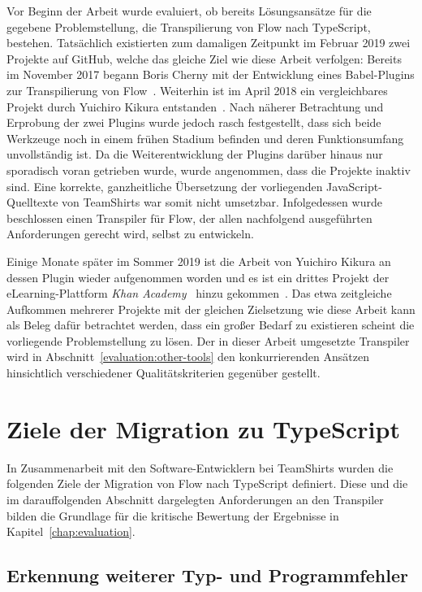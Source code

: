Vor Beginn der Arbeit wurde evaluiert, ob bereits Lösungsansätze für die gegebene Problemstellung, die Transpilierung von Flow nach TypeScript, bestehen. Tatsächlich existierten zum damaligen Zeitpunkt im Februar 2019 zwei Projekte auf GitHub, welche das gleiche Ziel wie diese Arbeit verfolgen: Bereits im November 2017 begann Boris Cherny mit der Entwicklung eines Babel-Plugins zur Transpilierung von Flow~\autocite{CHERNY:FLOW_TO_TS}. Weiterhin ist im April 2018 ein vergleichbares Projekt durch Yuichiro Kikura entstanden~\autocite{KIKURA:FLOW_TO_TS}. Nach näherer Betrachtung und Erprobung der zwei Plugins wurde jedoch rasch festgestellt, dass sich beide Werkzeuge noch in einem frühen Stadium befinden und deren Funktionsumfang unvollständig ist. Da die Weiterentwicklung der Plugins darüber hinaus nur sporadisch voran getrieben wurde, wurde angenommen, dass die Projekte inaktiv sind. Eine korrekte, ganzheitliche Übersetzung der vorliegenden JavaScript-Quelltexte von TeamShirts war somit nicht umsetzbar. Infolgedessen wurde beschlossen einen Transpiler für Flow, der allen nachfolgend ausgeführten Anforderungen gerecht wird, selbst zu entwickeln.

Einige Monate später im Sommer 2019 ist die Arbeit von Yuichiro Kikura an dessen Plugin wieder aufgenommen worden und es ist ein drittes Projekt der eLearning-Plattform \textit{Khan Academy}~\autocite{KHAN_ACADEMY} hinzu gekommen~\autocite{KHAN:FLOW_TO_TS}. Das etwa zeitgleiche Aufkommen mehrerer Projekte mit der gleichen Zielsetzung wie diese Arbeit kann als Beleg dafür betrachtet werden, dass ein großer Bedarf zu existieren scheint die vorliegende Problemstellung zu lösen. Der in dieser Arbeit umgesetzte Transpiler wird in Abschnitt~\ref{evaluation:other-tools} den konkurrierenden Ansätzen hinsichtlich verschiedener Qualitätskriterien gegenüber gestellt.

\section{Ziele der Migration zu TypeScript}
\label{analysis:goals}

In Zusammenarbeit mit den Software-Entwicklern bei TeamShirts wurden die folgenden Ziele der Migration von Flow nach TypeScript definiert. Diese und die im darauffolgenden Abschnitt dargelegten Anforderungen an den Transpiler bilden die Grundlage für die kritische Bewertung der Ergebnisse in Kapitel~\ref{chap:evaluation}.

\subsection{Erkennung weiterer Typ- und Programmfehler}

